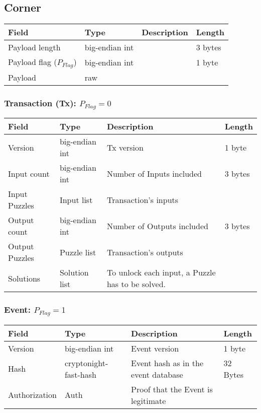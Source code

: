 \documentclass[a4paper,10pt]{article}
\begin{document}
        
        \subsection{Corner}
            \begin{tabularx}{\textwidth}{|l|l|X|l|}
            \hline Field & Type & Description & Length \\ \hline
            \hline Payload length & big-endian int &  & 3 bytes \\
            \hline Payload flag ($P_{Flag}$) & big-endian int &  & 1 byte \\
            \hline Payload & raw & & \\
            \hline
            \end{tabularx}
            
            
            \subsubsection{Transaction (Tx):  $P_{Flag} = 0$}
                \begin{tabularx}{\textwidth}{|l|l|X|l|}
                \hline Field & Type & Description & Length \\ \hline
                \hline Version & big-endian int & Tx version & 1 byte \\
                \hline Input count & big-endian int & Number of Inputs included & 3 bytes\\
                \hline Input Puzzles & Input list & Transaction's inputs & \\
                \hline Output count & big-endian int & Number of Outputs included & 3 bytes\\
                \hline Output Puzzles & Puzzle list & Transaction's outputs & \\
                \hline Solutions & Solution list & To unlock each input, a Puzzle has to be solved. & \\
                \hline
                \end{tabularx}
            
            
            \subsubsection{Event: $P_{Flag} = 1$}
                \begin{tabularx}{\textwidth}{|l|l|X|l|}
                \hline Field & Type & Description & Length \\ \hline
                \hline Version & big-endian int & Event version & 1 byte \\
                \hline Hash & cryptonight-fast-hash & Event hash as in the event database & 32 Bytes\\
                \hline Authorization & Auth & Proof that the Event is legitimate & \\
                \hline
                \end{tabularx}\\
        
\end{document}
